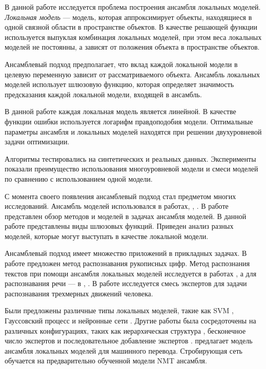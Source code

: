 \documentclass[12pt, twoside]{article}
\begin{document}
В данной работе исследуется проблема построения ансамбля локальных моделей. \textit{Локальная модель} --- модель, которая аппроксимирует объекты, находящиеся в одной связной области в пространстве объектов. В качестве решающей функции используется выпуклая комбинация локальных моделей, при этом веса локальных моделей не постоянны, а зависят от положения объекта в пространстве объектов. 

Ансамблевый подход предполагает, что вклад каждой локальной модели в целевую переменную зависит от рассматриваемого объекта. Ансамбль локальных моделей использует шлюзовую функцию, которая определяет значимость предсказания каждой локальной модели, входящей в ансамбль.

В данной работе каждая локальная модель является линейной. В качестве функции ошибки используется логарифм правдоподобия модели. Оптимальные параметры ансамбля и локальных моделей находятся при решении двухуровневой задачи оптимизации. 



Алгоритмы тестировались на синтетических и реальных данных.  Эксперименты показали преимущество использования многоуровневой модели и смеси моделей по сравнению с использованием одной модели.






С момента своего появления ансамблевый подход стал предметом многих исследований. Ансамбль моделей использовался в работах\cite{Yumlu2003}, \cite{Cheung1995}, \cite{Weigend2000}. В работе \cite{Yuksel2012} представлен обзор методов и моделей в задачах ансамбля моделей. В данной работе представлены виды шлюзовых функций. Приведен анализ разных моделей, которые могут выступать в качестве локальной модели. 

Ансамблевый подход имеет множество приложений в прикладных задачах. В работе \cite{article} предложен метод распознавания рукописных цифр. Метод распознания текстов при помощи ансамбля локальных моделей исследуется в работах \cite{Estabrooks2001}, а для распознавания речи --- в \cite{Mossavat2010}, \cite{Peng1996}. В работе \cite{Sminchisescu2007} исследуется смесь экспертов для задачи распознавания трехмерных движений человека.


Были предложены различные типы локальных моделей, такие как SVM \cite{Collobert2002}, Гауссовский процесс \cite{Tresp01mixturesof}  и нейронные сети \cite{Shazeer2017}. Другие работы была сосредоточены на различных конфигурациях, таких как иерархическая структура \cite{NIPS1991_514}, бесконечное число экспертов \cite{Rasmussen} и последовательное добавление экспертов \cite{Aljundi2016}. \cite{garmash-monz-2016-ensemble} предлагает модель ансамбля локальных моделей для машинного перевода. Стробирующая сеть обучается на предварительно обученной модели NMT ансамбля. 
\end{document}
